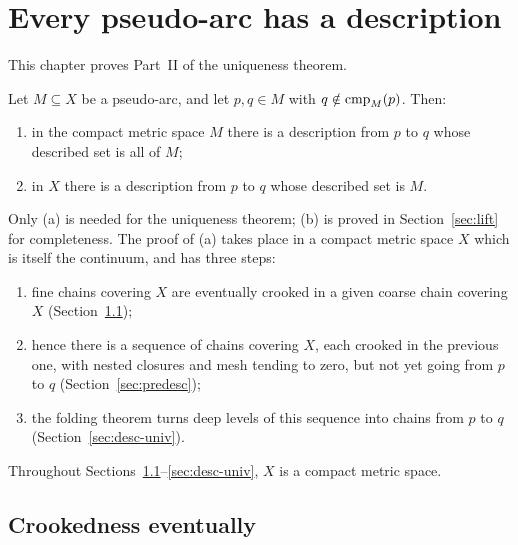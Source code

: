 \chapter{Every pseudo-arc has a description}\label{ch:descriptions}

This chapter proves Part~II of the uniqueness theorem.

\begin{theorem}\label{thm:desc-exists}
Let $M\subseteq X$ be a pseudo-arc, and let $p,q\in M$ with $q\notin\operatorname{cmp}_{M}(p)$. Then:
\begin{enumerate}[label=(\alph*)]
\item in the compact metric space $M$ there is a description from $p$ to $q$ whose described set is all of $M$;
\item in $X$ there is a description from $p$ to $q$ whose described set is $M$.
\end{enumerate}
\end{theorem}


Only (a) is needed for the uniqueness theorem; (b) is proved in Section~\ref{sec:lift} for completeness. The proof of (a) takes place
in a compact metric space $X$ which is itself the continuum, and has three steps:
\begin{enumerate}
\item fine chains covering $X$ are eventually crooked in a given coarse chain covering $X$ (Section~\ref{sec:crooked-eventually});
\item hence there is a sequence of chains covering $X$, each crooked in the previous one, with nested closures and mesh tending to
zero, but not yet going from $p$ to $q$ (Section~\ref{sec:predesc});
\item the folding theorem turns deep levels of this sequence into chains from $p$ to $q$ (Section~\ref{sec:desc-univ}).
\end{enumerate}
Throughout Sections~\ref{sec:crooked-eventually}--\ref{sec:desc-univ}, $X$ is a compact metric space.

\section{Crookedness eventually}\label{sec:crooked-eventually}

